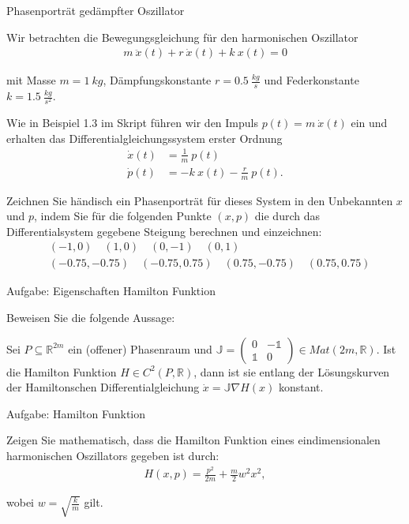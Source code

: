 \documentclass[letterpaper,10pt,german]{jupyterBook}
\begin{document}
\begin{emphBox}{}{}{Phasenporträt gedämpfter Oszillator}

\par
Wir betrachten die Bewegungsgleichung für den harmonischen Oszillator
\begin{align*}
m ~ \ddot x(t) + r ~ \dot x(t) + k ~ x(t) = 0
\end{align*}
\par
mit Masse \(m = 1  ~ kg\), Dämpfungskonstante \(r = 0.5 ~ \frac{kg}{s}\) und Federkonstante \(k = 1.5 ~ \frac{kg}{s^2}\).

\par
Wie in Beispiel 1.3 im Skript führen wir den Impuls \(p(t) = m ~ \dot x(t)\) ein und erhalten das Differentialgleichungssystem erster Ordnung
\begin{align*}
\dot x(t) &= \frac{1}{m} ~ p(t)\\
\dot p(t) &= -k ~ x(t) - \frac{r}{m} ~ p(t).
\end{align*}
\par
Zeichnen Sie händisch ein Phasenporträt für dieses System in den Unbekannten \(x\) und \(p\), indem Sie für die folgenden Punkte \((x,p)\) die durch das Differentialsystem gegebene Steigung berechnen und einzeichnen:
\begin{align*}
&(-1, 0) \quad  (1, 0) \quad (0, -1) \quad  (0, 1)\\
&(-0.75, -0.75) \quad  (-0.75, 0.75) \quad (0.75, -0.75) \quad (0.75, 0.75)
\end{align*}\end{emphBox}

\begin{emphBox}{}{}{Aufgabe: Eigenschaften Hamilton Funktion}

\par
Beweisen Sie die folgende Aussage:

\par
Sei \(P \subseteq \mathbb{R}^{2m}\) ein (offener) Phasenraum und \(\mathbb{J} = \begin{pmatrix} 0 & - 𝟙 \\ 𝟙 & 0 \end{pmatrix} \in Mat(2m, \mathbb{R})\). Ist die Hamilton Funktion \(H \in C^2(P, \mathbb{R})\), dann ist sie entlang der Lösungskurven der Hamiltonschen Differentialgleichung \(\dot x = \mathbb{J} \nabla H(x)\) konstant.
\end{emphBox}

\begin{emphBox}{}{}{Aufgabe: Hamilton Funktion}

\par
Zeigen Sie mathematisch, dass die Hamilton Funktion eines eindimensionalen harmonischen Oszillators gegeben ist durch:
\begin{align*}
H(x,p) = \frac{p^2}{2m} + \frac{m}{2} w^2 x^2,
\end{align*}
\par
wobei \(w = \sqrt{\frac{k}{m}}\) gilt.
\end{emphBox}
\end{document}
